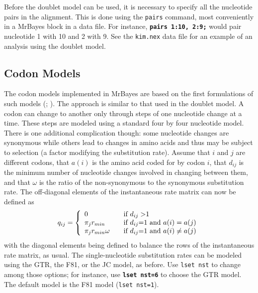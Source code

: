 \documentclass[12pt]{book}
\newcommand{\ttt}[1]{\texttt{#1}}
\newcommand{\tb}[1]{\ttt{\textbf{#1}}}
\begin{document}
Before the doublet model can be used, it is necessary to specify all the nucleotide pairs in the
alignment. This is done using the \ttt{pairs} command, most conveniently in a MrBayes block in a
data file. For instance, \tb{pairs 1:10, 2:9;} would pair nucleotide 1 with 10 and 2 with 9. See
the \ttt{kim.nex} data file for an example of an analysis using the doublet model.

\subsection{Codon Models}
The codon models implemented in MrBayes are based on the first formulations of such models
(\citet{goldman94}; \citet{muse94}). The approach is similar to that used in the doublet model. A
codon can change to another only through steps of one nucleotide change at a time. These steps are
modeled using a standard four by four nucleotide model. There is one additional complication
though: some nucleotide changes are synonymous while others lead to changes in amino acids and thus
may be subject to selection (a factor modifying the substitution rate). Assume that $i$ and $j$ are
different codons, that $a(i)$ is the amino acid coded for by codon $i$, that $d_{ij}$ is the
minimum number of nucleotide changes involved in changing between them, and that $\omega$ is the
ratio of the non-synonymous to the synonymous substitution rate. The off-diagonal elements of the
instantaneous rate matrix can now be defined as
\[
q_{ij} = \left\{
\begin{array}{l l}
  0 & \quad \text{if $d_{ij}>$1 } \\
 \pi_j r_{min} & \quad \text{if $d_{ij}$=1 and $a(i)=a(j)$}\\
 \pi_j r_{min} \omega & \quad \text{if $d_{ij}$=1 and $a(i)\neq a(j)$}\\
\end{array} \right.
\]
with the diagonal elements being defined to balance the rows of the instantaneous rate matrix, as
usual. The single-nucleotide substitution rates can be modeled using the GTR, the F81, or the JC
model, as before. Use \ttt{lset nst} to change among those options; for instance, use \tb{lset
nst=6} to choose the GTR model. The default model is the F81 model (\ttt{lset nst=1}).
\end{document}
